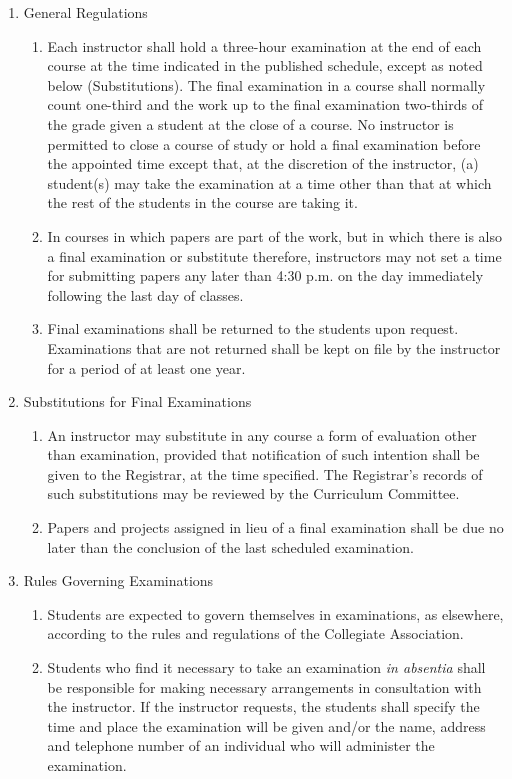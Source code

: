 \documentclass{manual}
\newcommand{\itemLevelB}{\arabic*)}
\newcommand{\itemRefB}{\arabic*}
\begin{document}
	\begin{enumerate}[label=\alph*]
	\item General Regulations

		\begin{enumerate}[label=\itemLevelB,ref=\itemRefB]
		\item Each instructor shall hold a three-hour examination at the end of each course at the time indicated in the published schedule, except as noted below (Substitutions). The final examination in a  course shall normally count one-third and the work up to the final examination two-thirds of the grade given a student at the close of a course. No instructor is permitted to close a course of study or hold a final examination before the appointed time except that, at the discretion of the instructor, (a) student(s) may take the examination at a time other than that at which the rest of the students in the course are taking it.
		\item  In courses in which papers are part of the work, but in which there is also a final examination or substitute therefore, instructors may not set a time for submitting papers any later than 4:30 p.m. on the day immediately following the last day of classes.
		\item  Final examinations shall be returned to the students upon request. Examinations that are not returned shall be kept on file by the instructor for a period of at least one year.
		\end{enumerate}
	
	\item Substitutions for Final Examinations

		\begin{enumerate}[label=\itemLevelB,ref=\itemRefB]
		\item An instructor may substitute in any course a form of evaluation other than examination, provided that notification of such intention shall be given to the Registrar, at the time specified. The Registrar's records of such substitutions may be reviewed by the Curriculum Committee.
		\item Papers and projects assigned in lieu of a final examination shall be due no later than the conclusion of the last scheduled examination.
		\end{enumerate}
	
	\item Rules Governing Examinations

		\begin{enumerate}[label=\itemLevelB,ref=\itemRefB]
		\item Students are expected to govern themselves in examinations, as elsewhere, according to the rules and regulations of the Collegiate Association.
		\item Students who find it necessary to take an examination \textit{in absentia} shall be responsible for making necessary arrangements in consultation with the instructor. If the instructor requests, the students shall specify the time and place the examination will be given and/or the name, address and telephone number of an individual who will administer the examination.
		\end{enumerate}
	

\end{enumerate}
\end{document}

